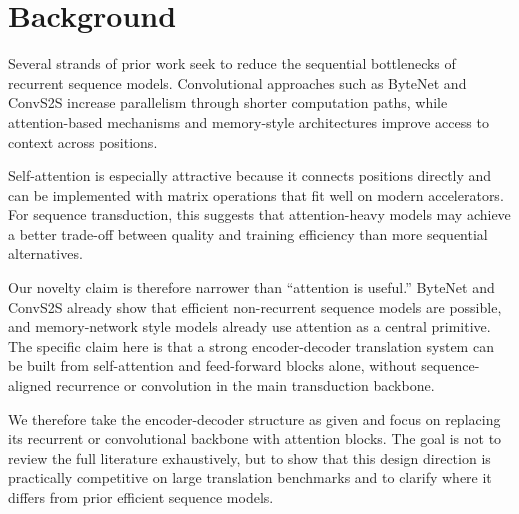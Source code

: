 \section{Background}

Several strands of prior work seek to reduce the sequential bottlenecks of recurrent sequence models. Convolutional approaches such as ByteNet and ConvS2S increase parallelism through shorter computation paths, while attention-based mechanisms and memory-style architectures improve access to context across positions.

Self-attention is especially attractive because it connects positions directly and can be implemented with matrix operations that fit well on modern accelerators. For sequence transduction, this suggests that attention-heavy models may achieve a better trade-off between quality and training efficiency than more sequential alternatives.

Our novelty claim is therefore narrower than “attention is useful.” ByteNet and ConvS2S already show that efficient non-recurrent sequence models are possible, and memory-network style models already use attention as a central primitive. The specific claim here is that a strong encoder-decoder translation system can be built from self-attention and feed-forward blocks alone, without sequence-aligned recurrence or convolution in the main transduction backbone.

We therefore take the encoder-decoder structure as given and focus on replacing its recurrent or convolutional backbone with attention blocks. The goal is not to review the full literature exhaustively, but to show that this design direction is practically competitive on large translation benchmarks and to clarify where it differs from prior efficient sequence models.
